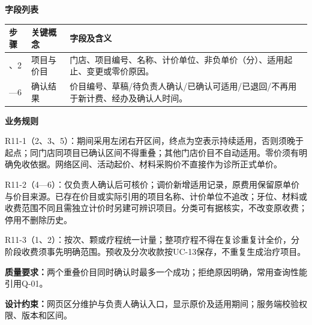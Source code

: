 \documentclass[UTF8,a4paper,zihao=-4,fontset=none]{ctexart}
\begin{document}
\noindent\textbf{字段列表}\par
{\setlength{\tabcolsep}{3pt}\renewcommand{\arraystretch}{1.04}
\noindent\begin{tabular}{@{}>{\raggedright\arraybackslash}p{1.2cm}>{\raggedright\arraybackslash}p{2.2cm}>{\raggedright\arraybackslash}p{12.3cm}@{}}
\toprule
步骤 & 关键概念 & 字段及含义 \\ \midrule
1、2 & 项目与价目 & 门店、项目编号、名称、计价单位、非负单价（分）、适用起止、变更或零价原因。 \\
3—6 & 确认结果 & 价目编号、草稿/待负责人确认/已确认可适用/已退回/不再用于新计费、经办及确认人时间。 \\
\bottomrule
\end{tabular}\par}
\smallskip
\noindent\textbf{业务规则}\par
\noindent R11-1（2、3、5）：期间采用左闭右开区间，终点为空表示持续适用，否则须晚于起点；同门店同项目已确认区间不得重叠；其他门店价目不自动适用。零价须有明确免收依据。网络区间、活动起价、材料采购价不直接作为诊所正式单价。\par
\noindent R11-2（4—6）：仅负责人确认后可核价；调价新增适用记录，原费用保留原单价与价目来源。已存在价目或实际引用的项目名称、计价单位不追改；牙位、材料或收费范围不同且需独立计价时另建可辨识项目。分类可有据核实，不改变原收费；停用不删除历史。\par
\smallskip
\noindent R11-3（1、2）：按次、颗或疗程统一计量；整项疗程不得在复诊重复计全价，分阶段收费须事先明确范围。预收及分次收款按UC-13保存，不重复生成治疗项目。\par
\noindent\textbf{质量要求：}两个重叠价目同时确认时最多一个成功；拒绝原因明确，常用查询性能引用Q-01。\par
\noindent\textbf{设计约束：}网页区分维护与负责人确认入口，显示原价及适用期间；服务端校验权限、版本和区间。\par
\endgroup
\clearpage
\end{document}

